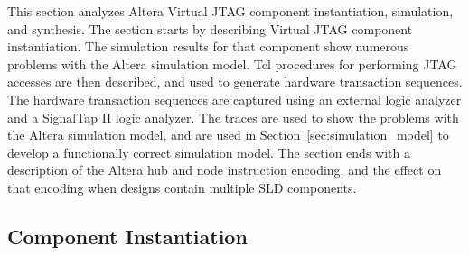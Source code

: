 \documentclass[10pt,twoside]{article}
\begin{document}
This section analyzes Altera Virtual JTAG component instantiation,
simulation, and synthesis. The section starts by describing
Virtual JTAG component instantiation. The simulation results
for that component show numerous problems with the Altera simulation
model. Tcl procedures for performing JTAG accesses are then
described, and used to generate hardware transaction sequences.
The hardware transaction sequences are captured using an external 
logic analyzer and a SignalTap II logic analyzer. The traces are
used to show the problems with the Altera simulation model, and 
are used in Section~\ref{sec:simulation_model} to develop a 
functionally correct simulation model.
The section ends with a description of the Altera hub and
node instruction encoding, and the effect on that encoding when 
designs contain multiple SLD components.

\subsection{Component Instantiation}
\label{sec:sld_virtual_jtag_instantiation}
\end{document}

